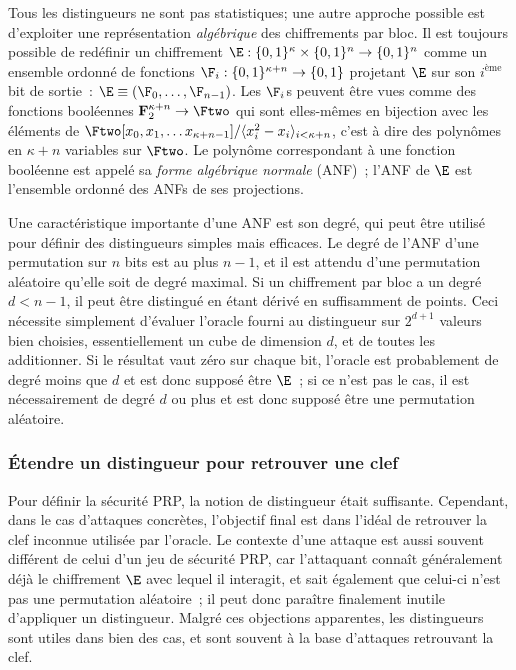 \bigskip

Tous les distingueurs ne sont pas statistiques;
une autre approche possible est d'exploiter une représentation \emph{algébrique} des chiffrements par bloc.
Il est toujours possible de redéfinir un chiffrement
$\E : \{0,1\}^\kappa \times \{0,1\}^n \rightarrow \{0,1\}^n$ comme un ensemble ordonné de fonctions $\F_i : \{0,1\}^{\kappa+n} \rightarrow \{0,1\}$ projetant
$\E$ sur son $i^\text{ème}$ bit de sortie~: $\E \equiv (\F_0, \ldots, \F_{n-1})$. Les $\F_i$s peuvent être vues comme des fonctions booléennes
$\mathbf{F}_{2}^{\kappa + n} \rightarrow \Ftwo$ qui sont elles-mêmes en bijection avec les éléments de
$\Ftwo[x_0,x_1,\ldots x_{\kappa + n-1}]/\langle x_i^2-x_i\rangle_{i<\kappa + n}$,
c'est à dire des polynômes en $\kappa + n$ variables sur $\Ftwo$. Le polynôme correspondant à une fonction booléenne est appelé sa \emph{forme algébrique normale}
(ANF)~;
l'ANF de $\E$ est l'ensemble ordonné des ANFs de ses projections.

Une caractéristique importante d'une ANF est son degré, qui peut être utilisé pour définir des distingueurs simples mais efficaces.
Le degré de l'ANF d'une permutation sur $n$ bits est au plus $n - 1$, et il est attendu d'une permutation aléatoire qu'elle soit de degré
maximal. Si un chiffrement par bloc a un degré $d < n - 1$, il peut être distingué en étant dérivé en suffisamment de points.
Ceci nécessite simplement d'évaluer l'oracle fourni au distingueur sur $2^{d+1}$ valeurs bien choisies, essentiellement un cube de dimension $d$, et de toutes
les additionner.
Si le résultat vaut zéro sur chaque bit, l'oracle est probablement de degré moins que $d$ et est donc supposé être $\E$~; si ce n'est pas le cas, il est
nécessairement de degré $d$ ou plus et est donc supposé être une permutation aléatoire.

\subsubsection{\'Etendre un distingueur pour retrouver une clef}

Pour définir la sécurité PRP, la notion de distingueur était suffisante. Cependant, dans le cas d'attaques concrètes, l'objectif
final est dans l'idéal de retrouver la clef inconnue utilisée par l'oracle.
Le contexte d'une attaque est aussi souvent différent de celui d'un jeu de sécurité PRP, car l'attaquant connaît généralement déjà
le chiffrement $\E$ avec lequel il interagit, et sait également que celui-ci n'est pas une permutation aléatoire~; il peut donc paraître finalement inutile
d'appliquer un distingueur.
Malgré ces objections apparentes, les distingueurs sont utiles dans bien des cas, et sont souvent à la base d'attaques retrouvant la clef.

